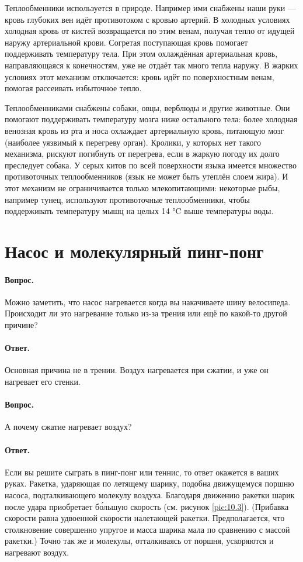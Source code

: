 Теплообменники используется в природе.
Например ими снабжены наши руки --- кровь глубоких вен идёт противотоком с кровью артерий.
В холодных условиях холодная кровь от кистей возвращается по этим венам, получая тепло от идущей наружу артериальной крови. Согретая поступающая кровь помогает поддерживать температуру тела.
При этом охлаждённая артериальная кровь, направляющаяся к конечностям, уже не отдаёт так много тепла наружу.
В жарких условиях этот механизм отключается: кровь идёт по поверхностным венам, помогая рассеивать избыточное тепло.

Теплообменниками снабжены собаки, овцы, верблюды и другие животные.
Они помогают поддерживать температуру мозга ниже остального тела: более холодная венозная кровь из рта и носа охлаждает артериальную кровь, питающую мозг (наиболее уязвимый к перегреву орган).
Кролики, у которых нет такого механизма, рискуют погибнуть от перегрева, если в жаркую погоду их долго преследует собака.
У серых китов по всей поверхности языка имеется множество противоточных теплообменников (язык не может быть утеплён слоем жира).
И этот механизм не ограничивается только млекопитающими: некоторые рыбы, например тунец, используют противоточные теплообменники, чтобы поддерживать температуру мышц на целых 14 °C выше температуры воды.

\section{Насос и молекулярный пинг-понг}
\label{Насос и молекулярный пинг-понг}

\paragraph{Вопрос.}
Можно заметить, что насос нагревается когда вы накачиваете шину велосипеда.
Происходит ли это нагревание только из-за трения или ещё по какой-то другой причине?

\paragraph{Ответ.}
Основная причина не в трении.
Воздух нагревается при сжатии, и уже он нагревает его стенки.

\paragraph{Вопрос.} А почему сжатие нагревает воздух?

\paragraph{Ответ.}
Если вы решите сыграть в пинг-понг или теннис, то ответ окажется в ваших руках.
Ракетка, ударяющая по летящему шарику, подобна движущемуся поршню насоса, подталкивающего молекулу воздуха.
Благодаря движению ракетки шарик после удара приобретает б\'{о}льшую скорость (см. рисунок \ref{pic:10.3}).
(Прибавка скорости равна удвоенной скорости налетающей ракетки.
Предполагается, что столкновение совершенно упругое и масса шарика мала по сравнению с массой ракетки.)
Точно так же и молекулы, отталкиваясь от поршня, ускоряются и нагревают воздух.

